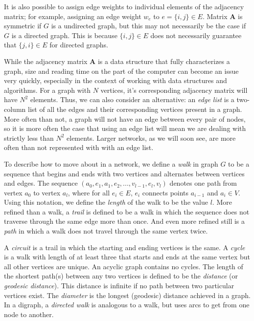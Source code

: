 \documentclass[12pt,twoside]{amherstthesis}
\begin{document}
  It is also possible to assign edge weights to individual elements of the
  adjacency matrix; for example, assigning an edge weight \(w_e\) to
  \(e = \{i, j\} \in E\). Matrix \(\textbf{A}\) is symmetric if \(G\) is a
  undirected graph, but this may not necessarily be the case if \(G\) is a
  directed graph. This is because \(\{i, j\} \in E\) does not necessarily
  guarantee that \(\{j, i\} \in E\) for directed graphs.
  
  While the adjacency matrix \(\textbf{A}\) is a data structure that fully
  characterizes a graph, size and reading time on the part of the computer
  can become an issue very quickly, especially in the context of working
  with data structures and algorithms. For a graph with \(N\) vertices,
  it's corresponding adjacency matrix will have \(N^2\) elements. Thus, we
  can also consider an alternative: an \emph{edge list} is a two-column
  list of all the edges and their corresponding vertices present in a
  graph. More often than not, a graph will not have an edge between every
  pair of nodes, so it is more often the case that using an edge list will
  mean we are dealing with strictly less than \(N^2\) elements. Larger
  networks, as we will soon see, are more often than not represented with
  with an edge list.
  
  To describe how to move about in a network, we define a \emph{walk} in
  graph \(G\) to be a sequence that begins and ends with two vertices and
  alternates between vertices and edges. The sequence
  \((a_0, e_1, a_1, e_2, ..., v_{l-1}, e_l, v_l)\) denotes one path from
  vertex \(a_0\) to vertex \(a_l\), where for all \(e_i \in E\), \(e_i\)
  connects points \(a_{i-1}\) and \(a_i \in V\). Using this notation, we
  define the \emph{length} of the walk to be the value \(l\). More refined
  than a walk, a \emph{trail} is defined to be a walk in which the
  sequence does not traverse through the same edge more than once. And
  even more refined still is a \emph{path} in which a walk does not travel
  through the same vertex twice.
  
  A \emph{circuit} is a trail in which the starting and ending vertices is
  the same. A \emph{cycle} is a walk with length of at least three that
  starts and ends at the same vertex but all other vertices are unique. An
  acyclic graph contains no cycles. The length of the shortest path(s)
  between any two vertices is defined to be the \emph{distance} (or
  \emph{geodesic distance}). This distance is infinite if no path between
  two particular vertices exist. The \emph{diameter} is the longest
  (geodesic) distance achieved in a graph. In a digraph, a \emph{directed
  walk} is analogous to a walk, but uses arcs to get from one node to
  another.
  
\end{document}
